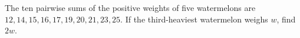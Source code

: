 The ten pairwise sums of the positive weights of five watermelons are $12,14,15,16,17,19,20,21,23,25$. If the third-heaviest watermelon weighs $w$, find $2w$.
